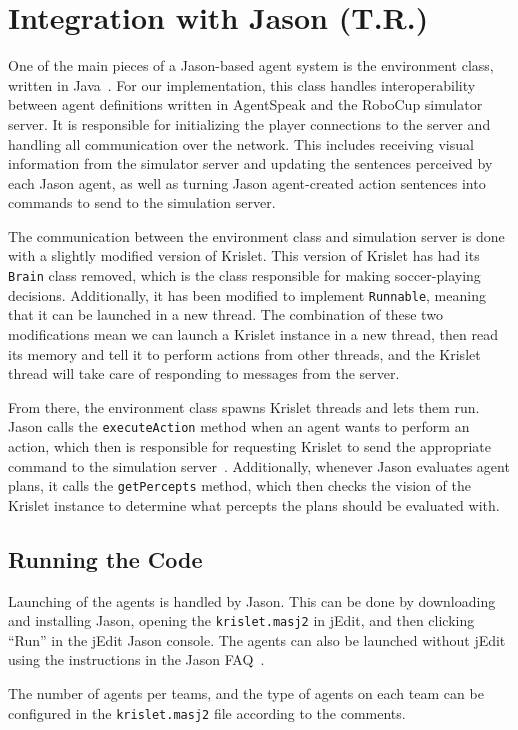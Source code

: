 \documentclass[conference]{IEEEtran}
\begin{document}
\section{Integration with Jason (T.R.)}
One of the main pieces of a Jason-based agent system is the environment class,
written in Java~\cite{jason-manual}. For our implementation, this class handles
interoperability between agent definitions written in AgentSpeak and the
RoboCup simulator server. It is responsible for initializing the player
connections to the server and handling all communication over the network. This
includes receiving visual information from the simulator server and updating
the sentences perceived by each Jason agent, as well as turning Jason
agent-created action sentences into commands to send to the simulation server.

The communication between the environment class and simulation server is done
with a slightly modified version of Krislet. This version of Krislet has had
its \texttt{Brain} class removed, which is the class responsible for making
soccer-playing decisions. Additionally, it has been modified to implement
\texttt{Runnable}, meaning that it can be launched in a new thread. The
combination of these two modifications mean we can launch a Krislet instance in
a new thread, then read its memory and tell it to perform actions from other
threads, and the Krislet thread will take care of responding to messages from
the server.

From there, the environment class spawns Krislet threads and lets them
run. Jason calls the \texttt{executeAction} method when an agent wants to
perform an action, which then is responsible for requesting Krislet to send the
appropriate command to the simulation server~\cite{jason-manual}. Additionally,
whenever Jason evaluates agent plans, it calls the \texttt{getPercepts} method,
which then checks the vision of the Krislet instance to determine what percepts
the plans should be evaluated with.

\subsection{Running the Code}
Launching of the agents is handled by Jason. This can be done by downloading
and installing Jason, opening the \texttt{krislet.masj2} in jEdit, and then
clicking ``Run'' in the jEdit Jason console. The agents can also be launched
without jEdit using the instructions in the Jason FAQ~\cite{jason-faq}.

The number of agents per teams, and the type of agents on each team can be
configured in the \texttt{krislet.masj2} file according to the comments.
\end{document}
